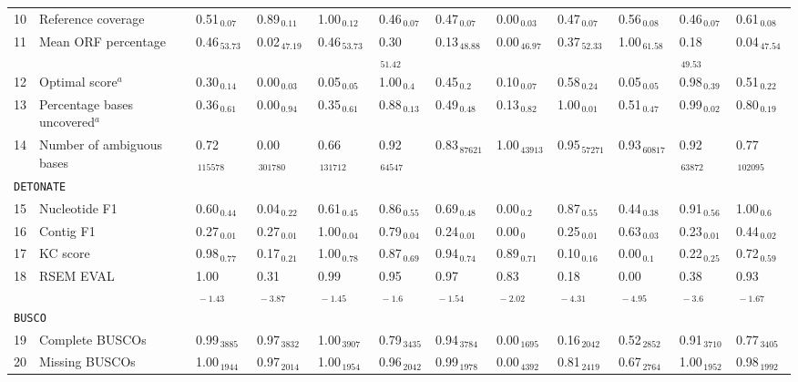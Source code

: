 \documentclass{scrartcl}
\begin{document}
\begin{landscape}
\begin{table}
\begin{scriptsize}
\begin{tabular}{llllllllllll}
10 & Reference coverage  & 0.51$_{\,0.07}$ & 0.89$_{\,0.11}$ & 1.00$_{\,0.12}$ & 0.46$_{\,0.07}$ & 0.47$_{\,0.07}$ & 0.00$_{\,0.03}$ & 0.47$_{\,0.07}$ & 0.56$_{\,0.08}$ & 0.46$_{\,0.07}$ & 0.61$_{\,0.08}$ \\11 & Mean ORF percentage  & 0.46$_{\,53.73}$ & 0.02$_{\,47.19}$ & 0.46$_{\,53.73}$ & 0.30$_{\,51.42}$ & 0.13$_{\,48.88}$ & 0.00$_{\,46.97}$ & 0.37$_{\,52.33}$ & 1.00$_{\,61.58}$ & 0.18$_{\,49.53}$ & 0.04$_{\,47.54}$ \\12 & Optimal score$^{a}$  & 0.30$_{\,0.14}$ & 0.00$_{\,0.03}$ & 0.05$_{\,0.05}$ & 1.00$_{\,0.4}$ & 0.45$_{\,0.2}$ & 0.10$_{\,0.07}$ & 0.58$_{\,0.24}$ & 0.05$_{\,0.05}$ & 0.98$_{\,0.39}$ & 0.51$_{\,0.22}$ \\13 & Percentage bases uncovered$^{a}$  & 0.36$_{\,0.61}$ & 0.00$_{\,0.94}$ & 0.35$_{\,0.61}$ & 0.88$_{\,0.13}$ & 0.49$_{\,0.48}$ & 0.13$_{\,0.82}$ & 1.00$_{\,0.01}$ & 0.51$_{\,0.47}$ & 0.99$_{\,0.02}$ & 0.80$_{\,0.19}$ \\14 & Number of ambiguous bases  & 0.72$_{\,115578}$ & 0.00$_{\,301780}$ & 0.66$_{\,131712}$ & 0.92$_{\,64547}$ & 0.83$_{\,87621}$ & 1.00$_{\,43913}$ & 0.95$_{\,57271}$ & 0.93$_{\,60817}$ & 0.92$_{\,63872}$ & 0.77$_{\,102095}$ \\\midrule
\multicolumn{11}{l}{\texttt{DETONATE}}\\ 
\midrule
15 & Nucleotide F1  & 0.60$_{\,0.44}$ & 0.04$_{\,0.22}$ & 0.61$_{\,0.45}$ & 0.86$_{\,0.55}$ & 0.69$_{\,0.48}$ & 0.00$_{\,0.2}$ & 0.87$_{\,0.55}$ & 0.44$_{\,0.38}$ & 0.91$_{\,0.56}$ & 1.00$_{\,0.6}$ \\16 & Contig F1  & 0.27$_{\,0.01}$ & 0.27$_{\,0.01}$ & 1.00$_{\,0.04}$ & 0.79$_{\,0.04}$ & 0.24$_{\,0.01}$ & 0.00$_{\,0}$ & 0.25$_{\,0.01}$ & 0.63$_{\,0.03}$ & 0.23$_{\,0.01}$ & 0.44$_{\,0.02}$ \\17 & KC score  & 0.98$_{\,0.77}$ & 0.17$_{\,0.21}$ & 1.00$_{\,0.78}$ & 0.87$_{\,0.69}$ & 0.94$_{\,0.74}$ & 0.89$_{\,0.71}$ & 0.10$_{\,0.16}$ & 0.00$_{\,0.1}$ & 0.22$_{\,0.25}$ & 0.72$_{\,0.59}$ \\18 & RSEM EVAL  & 1.00$_{\,-1.43}$ & 0.31$_{\,-3.87}$ & 0.99$_{\,-1.45}$ & 0.95$_{\,-1.6}$ & 0.97$_{\,-1.54}$ & 0.83$_{\,-2.02}$ & 0.18$_{\,-4.31}$ & 0.00$_{\,-4.95}$ & 0.38$_{\,-3.6}$ & 0.93$_{\,-1.67}$ \\\midrule
\multicolumn{11}{l}{\texttt{BUSCO}}\\ 
\midrule
19 & Complete BUSCOs  & 0.99$_{\,3885}$ & 0.97$_{\,3832}$ & 1.00$_{\,3907}$ & 0.79$_{\,3435}$ & 0.94$_{\,3784}$ & 0.00$_{\,1695}$ & 0.16$_{\,2042}$ & 0.52$_{\,2852}$ & 0.91$_{\,3710}$ & 0.77$_{\,3405}$ \\20 & Missing BUSCOs  & 1.00$_{\,1944}$ & 0.97$_{\,2014}$ & 1.00$_{\,1954}$ & 0.96$_{\,2042}$ & 0.99$_{\,1978}$ & 0.00$_{\,4392}$ & 0.81$_{\,2419}$ & 0.67$_{\,2764}$ & 1.00$_{\,1952}$ & 0.98$_{\,1992}$ \\\midrule

\end{tabular}
\end{scriptsize}
\end{table}
\end{landscape}
\end{document}
